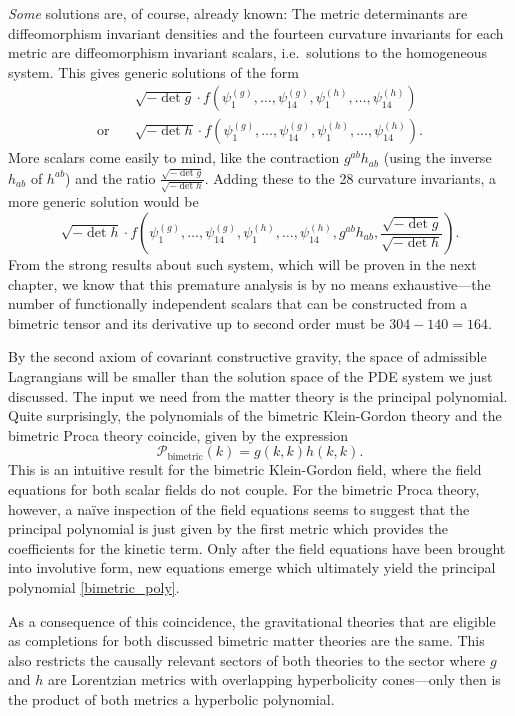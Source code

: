 \emph{Some} solutions are, of course, already known: The metric determinants are diffeomorphism invariant densities and the fourteen curvature invariants for each metric are diffeomorphism invariant scalars, i.e.~solutions to the homogeneous system. This gives generic solutions of the form
\begin{equation}
  \begin{aligned}
  {}& \sqrt{-\operatorname{det}g}\cdot f(\psi^{(g)}_1,\dots,\psi^{(g)}_{14},\psi^{(h)}_1,\dots,\psi^{(h)}_{14}) \\
    \text{or}\quad{}& \sqrt{-\operatorname{det}h}\cdot f(\psi^{(g)}_1,\dots,\psi^{(g)}_{14},\psi^{(h)}_1,\dots,\psi^{(h)}_{14}).
  \end{aligned}
\end{equation}
More scalars come easily to mind, like the contraction $g^{ab} h_{ab}$ (using the inverse $h_{ab}$ of $h^{ab}$) and the ratio $\frac{\sqrt{-\operatorname{det}g}}{\sqrt{-\operatorname{det}h}}$. Adding these to the 28 curvature invariants, a more generic solution would be
\begin{equation}
  \sqrt{-\operatorname{det}h}\cdot f(\psi^{(g)}_1,\dots,\psi^{(g)}_{14},\psi^{(h)}_1,\dots,\psi^{(h)}_{14},g^{ab}h_{ab}, \frac{\sqrt{-\operatorname{det}g}}{\sqrt{-\operatorname{det}h}}).
\end{equation}
From the strong results about such system, which will be proven in the next chapter, we know that this premature analysis is by no means exhaustive---the number of functionally independent scalars that can be constructed from a bimetric tensor and its derivative up to second order must be $304-140=164$.

By the second axiom of covariant constructive gravity, the space of admissible Lagrangians will be smaller than the solution space of the PDE system we just discussed. The input we need from the matter theory is the principal polynomial. Quite surprisingly, the polynomials of the bimetric Klein-Gordon theory and the bimetric Proca theory coincide, given by the expression
\begin{equation}\label{bimetric_poly}
  \mathcal P_\text{bimetric}(k) = g(k,k) h(k,k).
\end{equation}
This is an intuitive result for the bimetric Klein-Gordon field, where the field equations for both scalar fields do not couple. For the bimetric Proca theory, however, a na\"ive inspection of the field equations seems to suggest that the principal polynomial is just given by the first metric which provides the coefficients for the kinetic term. Only after the field equations have been brought into involutive form, new equations emerge which ultimately yield the principal polynomial \eqref{bimetric_poly}.\cite{wierzba}

As a consequence of this coincidence, the gravitational theories that are eligible as completions for both discussed bimetric matter theories are the same. This also restricts the causally relevant sectors of both theories to the sector where $g$ and $h$ are Lorentzian metrics with overlapping hyperbolicity cones---only then is the product of both metrics a hyperbolic polynomial.

